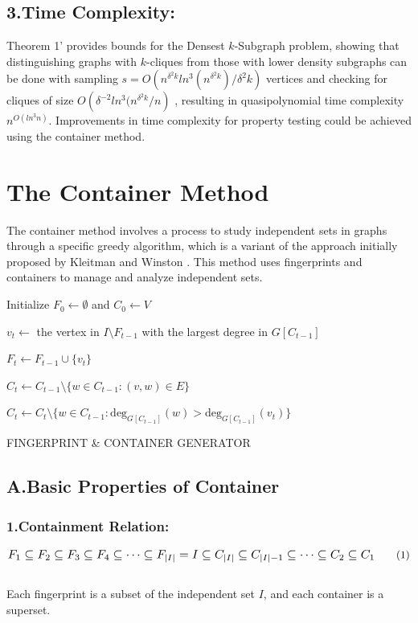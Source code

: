\documentclass[preprint,11pt]{elsarticle}
\theoremstyle{definition}
\begin{document}
\begin{multicols}{2}
\subsection*{3.Time Complexity:}
Theorem 1' provides bounds for the Densest $k$-Subgraph problem, showing that distinguishing graphs with $k$-cliques from those with lower density subgraphs can be done with sampling 
$s=O({n^{\delta^2k}ln^3(n^{\delta^2k})}/{\delta^2k})$ vertices and checking for cliques of size $O({\delta^{-2}ln^3(n^{\delta^2k}}/n)$ , resulting in quasipolynomial time complexity 
$n^{O(ln^3n)}$. Improvements in time complexity for property testing could be achieved using the container method.
\section{The Container Method}
The container method involves a process to study independent sets in graphs through a specific greedy algorithm, which is a variant of the approach initially proposed by Kleitman and Winston \cite{KW82}. This method uses fingerprints and containers to manage and analyze independent sets.
\begin{algorithm}[H]
\LinesNumbered
{}
Initialize $F_0 \gets \emptyset$ and $C_0 \gets V$\;
    {$v_t \gets$ the vertex in $I \setminus F_{t-1}$ with the largest degree in $G[C_{t-1}]$\;
    
    $F_t \gets F_{t-1} \cup \{v_t\}$\;   
    
    $C_t \gets C_{t-1} \setminus \{w \in C_{t-1} : (v, w) \in E \}$\;

    $C_t\gets C_t\setminus \{w \in C_{t-1}:\text{deg}_{G[C_{t-1}]}(w) > \text{deg}_{G[C_{t-1}]}(v_{t})\}$\;
    }
\;
\caption{FINGERPRINT \& CONTAINER GENERATOR}
\end{algorithm}
\subsection*{\textbf{A.Basic Properties of Container}}
\subsubsection*{1.Containment Relation:}
\begin{equation}
  \resizebox{\columnwidth}{!}{$
  F_1 \subseteq F_2 \subseteq F_3 \subseteq F_4 \subseteq \cdots \subseteq F_{|I|} = I \subseteq C_{|I|} \subseteq C_{|I|-1} \subseteq \cdots \subseteq C_2 \subseteq C_1  
  $}
  \tag{1}
\end{equation}
\\Each fingerprint is a subset of the independent set $I$, and each container is a superset.

\end{multicols}
\end{document}
